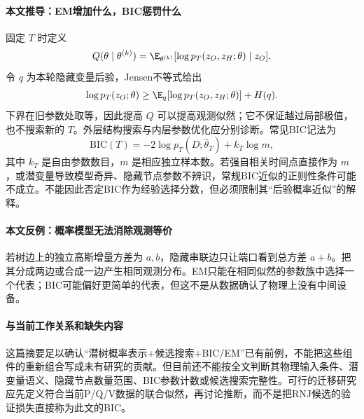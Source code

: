 \paragraph{本文推导：EM增加什么，BIC惩罚什么}
固定 $T$ 时定义
\begin{equation}
 Q(\theta\mid\theta^{(k)})=
 \E_{\theta^{(k)}}[\log p_T(z_O,z_H;\theta)\mid z_O].
\end{equation}
令 $q$ 为本轮隐藏变量后验，Jensen不等式给出
\begin{equation}
 \log p_T(z_O;\theta)\geq
 \E_q[\log p_T(z_O,z_H;\theta)]+H(q).
\end{equation}
下界在旧参数处取等，因此提高 $Q$ 可以提高观测似然；它不保证越过局部极值，也不搜索新的 $T$。外层结构搜索与内层参数优化应分别诊断。常见BIC记法为
\begin{equation}
 \mathrm{BIC}(T)=-2\log p_T(D;\widehat\theta_T)+k_T\log m,
\end{equation}
其中 $k_T$ 是自由参数数目，$m$ 是相应独立样本数。若强自相关时间点直接作为 $m$，或潜变量导致模型奇异、隐藏节点参数不辨识，常规BIC近似的正则性条件可能不成立。不能因此否定BIC作为经验选择分数，但必须限制其“后验概率近似”的解释。

\paragraph{本文反例：概率模型无法消除观测等价}
若树边上的独立高斯增量方差为 $a,b$，隐藏串联边只让端口看到总方差 $a+b$。把其分成两边或合成一边产生相同观测分布。EM只能在相同似然的参数族中选择一个代表；BIC可能偏好更简单的代表，但这不是从数据确认了物理上没有中间设备。

\paragraph{与当前工作关系和缺失内容}
这篇摘要足以确认“潜树概率表示+候选搜索+BIC/EM”已有前例，不能把这些组件的重新组合写成未有研究的贡献。但目前还不能按全文判断其物理输入条件、潜变量语义、隐藏节点数量范围、BIC参数计数或候选搜索完整性。可行的迁移研究应先定义符合当前P/Q/V数据的联合似然，再讨论推断，而不是把RNJ候选的验证损失直接称为此文的BIC。

